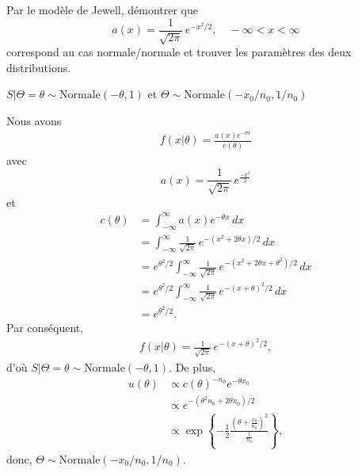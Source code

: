 \begin{exercice}
  Par le modèle de Jewell, démontrer que
  \begin{equation*}
    a(x) = \frac{1}{\sqrt{2 \pi}}\, e^{-x^2/2}, \quad
    -\infty < x < \infty
  \end{equation*}
  correspond au cas normale/normale et trouver les paramètres des
  deux distributions.
  \begin{rep}
    $S|\Theta = \theta \sim \text{Normale}(-\theta, 1)$ et $\Theta
    \sim \text{Normale}(-x_0/n_0, 1/n_0)$
  \end{rep}
  \begin{sol}
    Nous avons
    \begin{align*}
      f(x|\theta) = \frac{a(x) e^{-\theta x}}{c(\theta)}
    \end{align*}
    avec
    \begin{equation*}
      a(x) = \frac{1}{\sqrt{2\pi}}\, e^{\frac{-x^2}{2}}
    \end{equation*}
    et
    \begin{align*}
      c(\theta)
      &= \int_{-\infty}^{\infty} a(x) e^{-\theta x}\, dx \\
      &= \int_{-\infty}^{\infty} \frac{1}{\sqrt{2\pi}}\,
      e^{-(x^2 + 2\theta x)/2}\, dx \\
      &= e^{\theta^2/2} \int_{-\infty}^{\infty} \frac{1}{\sqrt{2\pi}}\,
      e^{-(x^2 + 2\theta x + \theta^2)/2}\, dx \\
      &= e^{\theta^2/2} \int_{-\infty}^{\infty} \frac{1}{\sqrt{2\pi}}\,
      e^{-(x + \theta)^2/2}\, dx \\
      &= e^{\theta^2/2}.
    \end{align*}
    Par conséquent,
    \begin{align*}
      f(x|\theta) = \frac{1}{\sqrt{2\pi}}\,
      e^{-(x + \theta)^2/2},
    \end{align*}
    d'où $S|\Theta = \theta \sim \text{Normale}(-\theta, 1)$. De plus,
    \begin{align*}
      u(\theta)
      &\propto c(\theta)^{-n_0} e^{-\theta x_0} \\
      &\propto e^{-(\theta^2 n_0 + 2 \theta x_0)/2} \\
      &\propto \exp
      \left\{
        - \frac{1}{2} \frac{(\theta + \frac{x_0}{n_0})^2}{\frac{1}{n_0}}
      \right\},
    \end{align*}
    donc, $\Theta \sim \text{Normale}(-x_0/n_0, 1/n_0)$.
  \end{sol}
\end{exercice}


